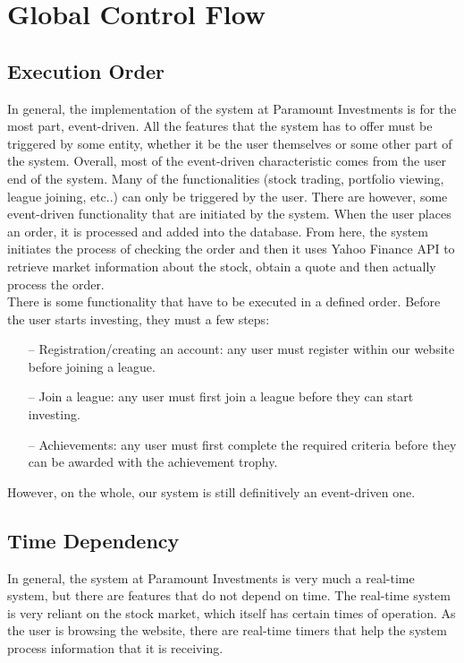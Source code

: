 \section{Global Control Flow}

\subsection{Execution Order}
In general, the implementation of the system at Paramount Investments
is for the most part, event-driven.  All the features that the system
has to offer must be triggered by some entity, whether it be the user
themselves or some other part of the system.  Overall, most of the
event-driven characteristic comes from the user end of the system.
Many of the functionalities (stock trading, portfolio viewing, league
joining, etc..) can only be triggered by the user.  There are however,
some event-driven functionality that are initiated by the system. When
the user places an order, it is processed and added into the database.
From here, the system initiates the process of checking the order and
then it uses Yahoo Finance API to retrieve market information about the
stock, obtain a quote and then actually process the order.\\

There is some functionality that have to be executed in a defined order.
Before the user starts investing, they must a few steps:
\begin{itemize}

\item[--]{Registration/creating an account: any user must register
within our website before joining a league.}

\item[--]{Join a league: any user must first join a league before
they can start investing.}

\item[--]{Achievements: any user must first complete the required
criteria before they can be awarded with the achievement trophy.}

\end{itemize}

However, on the whole, our system is still definitively an event-driven one.

\subsection{Time Dependency}
In general, the system at Paramount Investments is very much a real-time system,
but there are features that do not depend on time.  The real-time system is very
reliant on the stock market, which itself has certain times of operation.  As
the user is browsing the website, there are real-time timers that help the system
process information that it is receiving.

